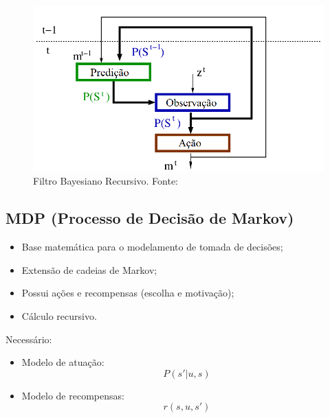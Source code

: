 \documentclass{beamer}
\begin{document}
\begin{frame}

\begin{figure}[h]
    \centering
    \includegraphics[width=\linewidth]{images/modelo_bayesiano-carla}
    \caption{\label{img:ModeloProbabilisticoCarla}Filtro Bayesiano Recursivo. Fonte: \cite{Koike:2005}}
\end{figure}
\end{frame}


\subsection{MDP (Processo de Decisão de Markov)}

\begin{frame}

\begin{itemize}
	\item Base matemática para o modelamento de tomada de decisões;\pause
	\item Extensão de cadeias de Markov;\pause
	\item Possui ações e recompensas (escolha e motivação);\pause
	\item Cálculo recursivo.
\end{itemize}
\end{frame}


\begin{frame}
Necessário:
\begin{itemize}
	\item Modelo de atuação: $$ P \left(s' | u, s \right) $$\pause
	\item Modelo de recompensas: $$ r \left( s, u, s' \right) $$
\end{itemize}
\end{frame}
\end{document}
